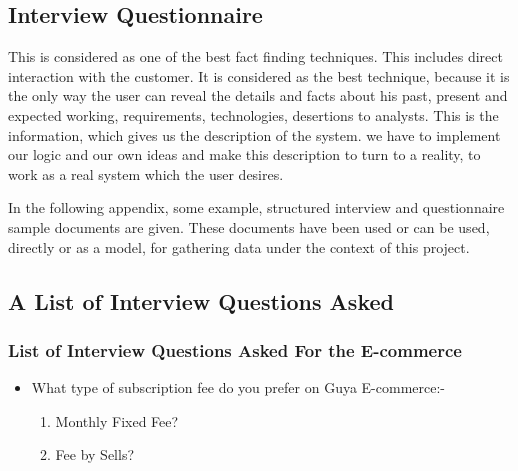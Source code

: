 \appendix
\appendixpage

\begin{appendices}	
\chapter{Interview  Questionnaire}
This is considered as one of the best fact finding techniques. This includes direct interaction with the customer. It is considered as the best technique, because it is the only way the user can reveal the details and facts about his past, present and expected working, requirements, technologies, desertions to analysts. This is the information, which gives us the description of the system. we have to implement our logic and our own ideas and make this description to turn to a reality, to work as a real system which the user desires. 

In the following appendix, some example, structured interview and questionnaire sample documents are given. These documents have been used or can be used, directly or as a model, for gathering data under the context of this project.

\section{A List of Interview Questions Asked}
\subsection{List of Interview Questions Asked For the E-commerce}
\begin{itemize}
	\item What type of subscription fee do you prefer on  Guya E-commerce:-
	\begin{enumerate}
		\item Monthly Fixed Fee?
		\item Fee by Sells?
	\end{enumerate}
\end{itemize}


\end{appendices}
